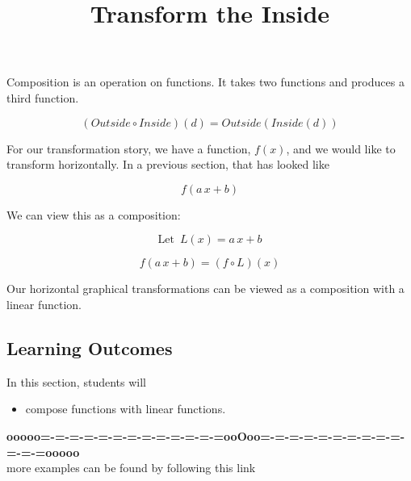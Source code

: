 \documentclass{ximera}
\title{Transform the Inside}
\begin{document}
\begin{abstract}
\end{abstract}
\maketitle






Composition is an operation on functions.  It takes two functions and produces a third function.


\[  (Outside \circ Inside)(d) = Outside(Inside(d))    \]


For our transformation story, we have a function, $f(x)$, and we would like to transform horizontally.  In a previous section, that has looked like


\[   f(a \, x + b)  \]


We can view this as a composition:


\[  \text{Let } \, L(x) = a \, x + b   \]


\[   f(a \, x + b)  = (f \circ L)(x)\]



Our horizontal graphical transformations can be viewed as a composition with a linear function.





\subsection{Learning Outcomes}


\begin{sectionOutcomes}
In this section, students will 

\begin{itemize}
\item compose functions with linear functions.
\end{itemize}
\end{sectionOutcomes}











\begin{center}
\textbf{\textcolor{green!50!black}{ooooo=-=-=-=-=-=-=-=-=-=-=-=-=ooOoo=-=-=-=-=-=-=-=-=-=-=-=-=ooooo}} \\

more examples can be found by following this link\\ 

\end{center}
\end{document}

